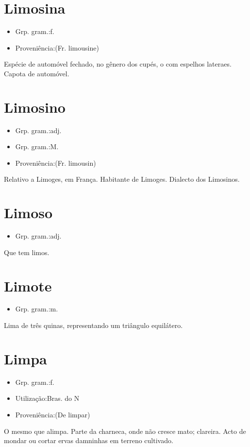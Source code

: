 \section{Limosina}
\begin{itemize}
\item {Grp. gram.:f.}
\end{itemize}
\begin{itemize}
\item {Proveniência:(Fr. \textunderscore limousine\textunderscore )}
\end{itemize}
Espécie de automóvel fechado, no gênero dos cupés, o com espelhos lateraes.
Capota de automóvel.
\section{Limosino}
\begin{itemize}
\item {Grp. gram.:adj.}
\end{itemize}
\begin{itemize}
\item {Grp. gram.:M.}
\end{itemize}
\begin{itemize}
\item {Proveniência:(Fr. \textunderscore limousin\textunderscore )}
\end{itemize}
Relativo a Limoges, em França.
Habitante de Limoges.
Dialecto dos Limosinos.
\section{Limoso}
\begin{itemize}
\item {Grp. gram.:adj.}
\end{itemize}
Que tem limos.
\section{Limote}
\begin{itemize}
\item {Grp. gram.:m.}
\end{itemize}
Lima de três quinas, representando um triângulo equilátero.
\section{Limpa}
\begin{itemize}
\item {Grp. gram.:f.}
\end{itemize}
\begin{itemize}
\item {Utilização:Bras. do N}
\end{itemize}
\begin{itemize}
\item {Proveniência:(De \textunderscore limpar\textunderscore )}
\end{itemize}
O mesmo que \textunderscore alimpa\textunderscore .
Parte da charneca, onde não cresce mato; clareira.
Acto de mondar ou cortar ervas damninhas em terreno cultivado.

